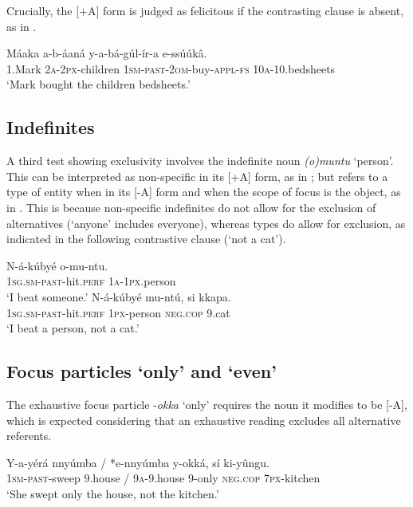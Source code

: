 \documentclass[output=paper]{langsci/langscibook}
\begin{document}
Crucially, the [+A] form is judged as felicitous if the contrasting clause is absent, as in .

\ea\label{ex:vanderwal:29}
\gll   Máaka  a-b-áaná    y-a-bá-gúl-ír-a      e-ssúúkâ.\\
       1.Mark  \textsc{2a}-\textsc{2px}-children  \textsc{1sm}-\textsc{past}-\textsc{2om}-buy-\textsc{appl}-\textsc{fs}  \textsc{10a}-10.bedsheets\\
\glt   ‘Mark bought the children bedsheets.’
\z

\subsection{Indefinites}\label{sec:vanderwal:4.3} %

A third test showing exclusivity involves the indefinite noun \textit{(o)muntu} ‘person’. This can be interpreted as non-specific in its [+A] form, as in ; but refers to a type of entity when in its [-A] form and when the scope of focus is the object, as in . This is because non-specific indefinites do not allow for the exclusion of alternatives (‘anyone’ includes everyone), whereas types do allow for exclusion, as indicated in the following contrastive clause (‘not a cat’).

\ea\label{ex:vanderwal:30}
\ea\label{ex:vanderwal:30a}
\gll     N-á-kúbyé      o-mu-ntu.\\
         \textsc{1sg}.\textsc{sm}-\textsc{past}-hit.\textsc{perf}  \textsc{1a}-\textsc{1px}.person\\
\glt     ‘I beat someone.’
\ex\label{ex:vanderwal:30b}
\gll     N-á-kúbyé      mu-ntú,  si    kkapa.\\
         \textsc{1sg}.\textsc{sm}-\textsc{past}-hit.\textsc{perf}  \textsc{1px}-person  \textsc{neg.cop}  9.cat\\
\glt     ‘I beat a person, not a cat.’
\z
\z

\subsection{Focus particles ‘only’ and ‘even’}\label{sec:vanderwal:4.4} %

The exhaustive focus particle -\textit{okka} ‘only’ requires the noun it modifies to be [-A], which is expected considering that an exhaustive reading excludes all alternative referents.

\ea\label{ex:vanderwal:31}
\gll   Y-a-yérá    nnyúmba /  *e-nnyúmba  y-okká,  sí    ki-yûngu.\\
       \textsc{1sm}-\textsc{past}-sweep  9.house /  \textsc{9a}-9.house  9-only  \textsc{neg}.\textsc{cop}  \textsc{7px}-kitchen\\
\glt ‘She swept only the house, not the kitchen.’
\z
\end{document}
